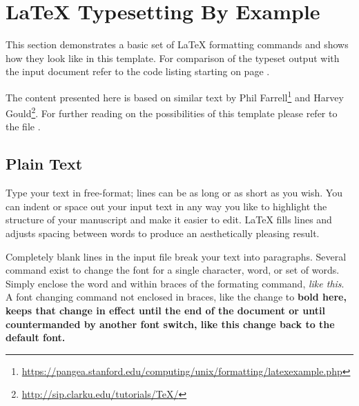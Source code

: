 
\section{LaTeX Typesetting By Example}
\label{sec:example:tutorial}
This section demonstrates a basic set of LaTeX formatting commands and shows how they look like in this template. For comparison of the typeset output with the input document refer to the code listing starting on page \pageref{sec:example:code}.

The content presented here is based on similar text by Phil Farrell\footnote{\url{https://pangea.stanford.edu/computing/unix/formatting/latexexample.php}} and Harvey Gould\footnote{\url{http://sip.clarku.edu/tutorials/TeX/}}.
For further reading on the possibilities of this template please refer to the file .

\newcommand{\cs}[1]{\texttt{\textbackslash{}#1}}

\subsection{Plain Text}
\label{sec:example:PlainText}

Type your text in free-format; lines can be as long
or as short as you wish.
        You can indent         or space out
        your input 
            text in 
                any way you like to highlight the structure
        of your manuscript and make it easier to edit.
LaTeX fills lines and adjusts spacing between words to produce an
aesthetically pleasing result.

Completely blank lines in the input file break your text into
paragraphs.
Several command exist to change the font for a single character, word, or set of words. Simply enclose the word and within braces of the formating command, 
\emph{like this}.
A font changing command not enclosed in braces, like the change to \bfseries 
bold here, keeps that change in effect until the end of the document or
until countermanded by another font switch, like this change back to 
\normalfont the default font. 

